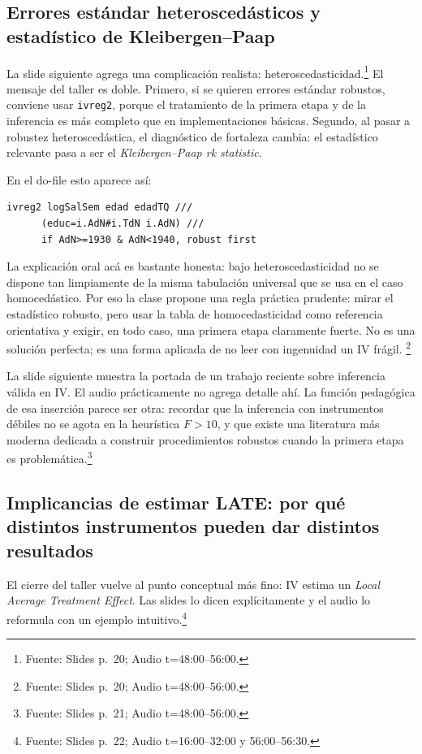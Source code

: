 \documentclass[11pt]{article}
\newcommand{\source}[2]{\footnote{Fuente: Slides p.~#1; Audio t=#2.}}
\begin{document}
\subsection{Errores estándar heteroscedásticos y estadístico de Kleibergen--Paap}

La slide siguiente agrega una complicación realista: heteroscedasticidad.\source{20}{48:00--56:00} El mensaje del taller es doble. Primero, si se quieren errores estándar robustos, conviene usar \texttt{ivreg2}, porque el tratamiento de la primera etapa y de la inferencia es más completo que en implementaciones básicas. Segundo, al pasar a robustez heteroscedástica, el diagnóstico de fortaleza cambia: el estadístico relevante pasa a ser el \emph{Kleibergen--Paap rk statistic}.

En el do-file esto aparece así:
\begin{lstlisting}
ivreg2 logSalSem edad edadTQ ///
      (educ=i.AdN#i.TdN i.AdN) ///
      if AdN>=1930 & AdN<1940, robust first
\end{lstlisting}

La explicación oral acá es bastante honesta: bajo heteroscedasticidad no se dispone tan limpiamente de la misma tabulación universal que se usa en el caso homocedástico. Por eso la clase propone una regla práctica prudente: mirar el estadístico robusto, pero usar la tabla de homocedasticidad como referencia orientativa y exigir, en todo caso, una primera etapa claramente fuerte. No es una solución perfecta; es una forma aplicada de no leer con ingenuidad un IV frágil. \source{20}{48:00--56:00}

La slide siguiente muestra la portada de un trabajo reciente sobre inferencia válida en IV. El audio prácticamente no agrega detalle ahí. La función pedagógica de esa inserción parece ser otra: recordar que la inferencia con instrumentos débiles no se agota en la heurística \(F>10\), y que existe una literatura más moderna dedicada a construir procedimientos robustos cuando la primera etapa es problemática.\source{21}{48:00--56:00}

\subsection{Implicancias de estimar LATE: por qué distintos instrumentos pueden dar distintos resultados}

El cierre del taller vuelve al punto conceptual más fino: IV estima un \emph{Local Average Treatment Effect}. Las slides lo dicen explícitamente y el audio lo reformula con un ejemplo intuitivo.\source{22}{16:00--32:00 y 56:00--56:30}
\end{document}

